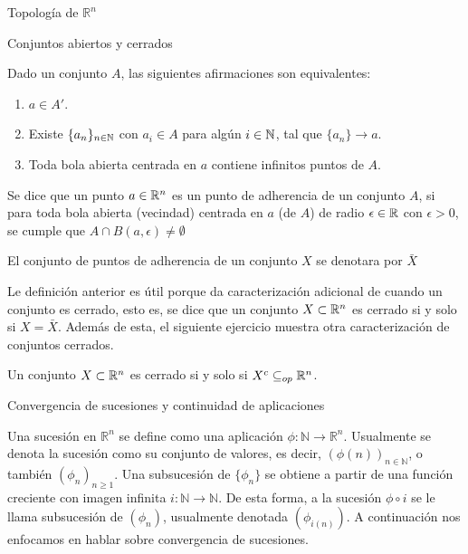 \begin{chapter}{Topología de $\mathbb{R}^n$}
\begin{section}{Conjuntos abiertos y cerrados}
\begin{exer}
Dado un conjunto $A$, las siguientes afirmaciones son equivalentes:
\begin{enumerate}
\item $a \in A'$.
\item Existe $\{a_n\}_{n \in \mathbb{N}}$ con $a_i \in A$ para algún $i \in \mathbb{N}$, tal que $\{a_n\} \to a$.
\item Toda bola abierta centrada en $a$ contiene infinitos puntos de $A$.
\end{enumerate}
\end{exer}

\begin{defn}
Se dice que un punto $a \in \mathbb{R}^n$ es un punto de adherencia de un conjunto $A$, si para toda bola abierta (vecindad) centrada en $a$ (de $A$) de radio $\epsilon \in \mathbb{R}$ con $\epsilon > 0$, se cumple que $A \cap B(a, \epsilon) \neq \emptyset$
\end{defn}

\begin{notn}
El conjunto de puntos de adherencia de un conjunto $X$ se denotara por $\bar{X}$
\end{notn}

Le definición anterior es útil porque da caracterización adicional de cuando un conjunto es cerrado, esto es, se dice que un conjunto $X \subset \mathbb{R}^n$ es cerrado si y solo si $X = \bar{X}$. Además de esta, el siguiente ejercicio muestra otra caracterización de conjuntos cerrados.

\begin{exer}
Un conjunto $X \subset \mathbb{R}^n$ es cerrado si y solo si $X^c \subseteq_{op} \mathbb{R}^n$.
\end{exer}

\end{section}

\begin{section}{Convergencia de sucesiones y continuidad de aplicaciones}

Una sucesión en $\mathbb{R}^n$ se define como una aplicación $\phi: \mathbb{N} \to \mathbb{R}^n$. Usualmente se denota la sucesión como su conjunto de valores, es decir, $( \phi(n))_{n \in \mathbb{N}}$, o también $(\phi_n)_{n \geq 1}$. Una subsucesión de $\{ \phi_n \}$ se obtiene a partir de una función creciente con imagen infinita $i: \mathbb{N} \to \mathbb{N}$. De esta forma, a la sucesión $\phi \circ i$ se le llama subsucesión de $(\phi_n )$, usualmente denotada $( \phi_{i(n)} )$. A continuación nos enfocamos en hablar sobre convergencia de sucesiones.


\end{section}
\end{chapter}
